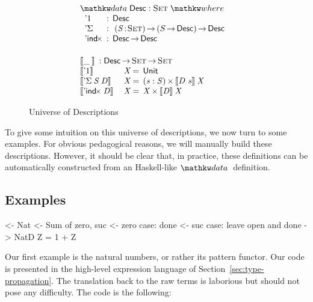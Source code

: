 \begin{figure}

\[\stk{
\begin{array}{ll}
\stk{
\data \Desc : \Set \where \\
\;\;\begin{array}{@{}l@{\::\:\:}l@{\quad}l}
    \DUnit          & \Desc \\
    \DSigma         & \PI{\V{S}}{\Set} \PIS{S \To \Desc} \Desc \\
    \DIndx          & \Desc \To \Desc
\end{array}
}
\vspace{0.2in}
\\
\stk{
\descop{\_\:}{} : \Desc \To \Set \To \Set \\
\begin{array}{@{}ll@{\:=\:\:}ll}
\descop{\DUnit}{& \V{X}}        &  \Unit                                       \\
\descop{\DSigma{\V{S}}{\V{D}}}{& \V{X}} &  \SIGMAS{\V{s} : \V{S}}{\descop{\V{D}~\V{s}}{\V{X}}}         \\
\descop{\DIndx{\V{D}}}{& \V{X}}     &  \TIMES{\V{X}}{\descop{\V{D}}{\V{X}}}
\end{array}
}
\end{array}
}\]


\caption{Universe of Descriptions}
\label{fig:desc_universe}

\end{figure}

To give some intuition on this universe of descriptions, we now turn
to some examples. For obvious pedagogical reasons, we will manually
build these descriptions. However, it should be clear that, in
practice, these definitions can be automatically constructed from an
Haskell-like $\data$ definition.

\subsection{Examples}
\label{sec:desc-examples}

\begin{wstructure}
<- Nat
    <- Sum of zero, suc
    <- zero case: done
    <- suc case: leave open and done
    -> NatD Z = 1 + Z
\end{wstructure}

Our first example is the natural numbers, or rather its pattern
functor. Our code is presented in the high-level expression language
of Section~\ref{sec:type-propagation}. The translation back to the raw
terms is laborious but should not pose any difficulty. The code is the
following:

